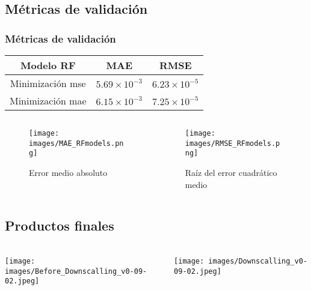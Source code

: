 \documentclass{beamer}
\begin{document}
  \subsection*{Métricas de validación}

  \begin{frame}
    \frametitle{Métricas de validación}

    \begin{center}
      \begin{tabular}{| c | c | c |}
        \hline
        Modelo RF& MAE & RMSE\\ \hline
        Minimización mse &  $5.69\times 10^{-3}$ & $6.23 \times 10^{-5}$\\
        Minimización mae &  $6.15\times 10^{-3}$ & $7.25 \times 10^{-5}$\\
        \hline
      \end{tabular}
      
    \end{center}

    \begin{columns}

      \begin{column}{0.5\textwidth}
        \begin{figure}
          \centering
          \texttt{[image: images/MAE\_RFmodels.png]}
          \caption{Error medio absoluto}
        \end{figure}
      \end{column}

      \begin{column}{0.5\textwidth}
        \begin{figure}
          \centering
          \texttt{[image: images/RMSE\_RFmodels.png]}
          \caption{Raíz del error cuadrático medio}
        \end{figure}
      \end{column}
    \end{columns}
  \end{frame}

  \subsection*{Productos finales}

  \begin{frame}
    \frametitle{}

    \begin{columns}

      \begin{column}{0.5\textwidth}
        \texttt{[image: images/Before\_Downscalling\_v0-09-02.jpeg]}
      \end{column}

      \begin{column}{0.5\textwidth}
        \centering
        \texttt{[image: images/Downscalling\_v0-09-02.jpeg]}
      \end{column}

    \end{columns}
  \end{frame}
\end{document}
